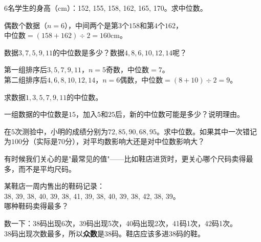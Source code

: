 \begin{example}
$6$名学生的身高（cm）：152, 155, 158, 162, 165, 170。求中位数。
\end{example}
\begin{solution}
偶数个数据（$n=6$），中间两个是第$3$个$158$和第$4$个$162$，\\
中位数$=(158+162)\div2=160$cm。
\end{solution}

\begin{example}
数据$3,7,5,9,11$的中位数是多少？数据$4,8,6,10,12,14$呢？
\end{example}
\begin{solution}
第一组排序后$3,5,7,9,11$，$n=5$奇数，中位数$=7$。\\
第二组排序后$4,6,8,10,12,14$，$n=6$偶数，中位数$=(8+10)\div2=9$。
\end{solution}


\begin{exercise}
\item 求数据$1,3,5,7,9,11$的中位数。
\item 一组数据的中位数是$15$，加入$5$和$25$后，新的中位数可能是多少？说明理由。
\item 在$5$次测验中，小明的成绩分别为$72,85,90,68,95$。求中位数。如果其中一次错记为$100$分（实际是$70$分），对平均数影响大还是对中位数影响大？
\end{exercise}


有时候我们关心的是"最常见的值"——比如鞋店进货时，更关心哪个尺码卖得最多，而不是平均尺码。

\begin{example}
某鞋店一周内售出的鞋码记录：\\
38, 39, 38, 40, 39, 38, 41, 39, 38, 40, 39, 38, 42, 38, 39。\\
哪种鞋码卖得最多？
\end{example}
\begin{solution}
数一下：38码出现6次，39码出现5次，40码出现2次，41码1次，42码1次。\\
38码出现次数最多，所以\textbf{众数}是38码。鞋店应该多进38码的鞋。
\end{solution}

